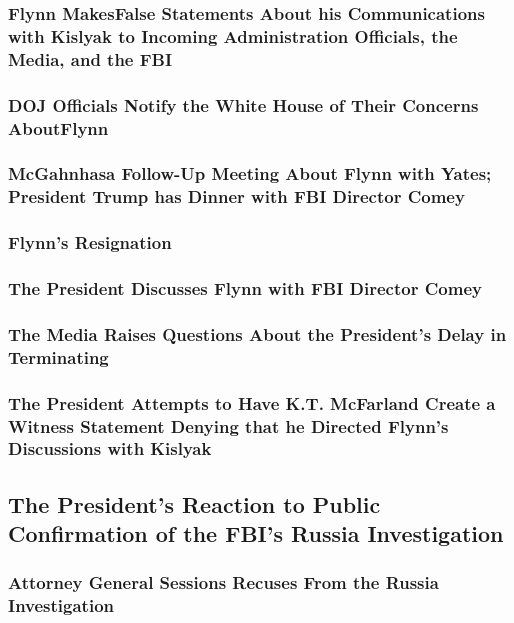 \subsubsection{Flynn MakesFalse Statements About his Communications with Kislyak to Incoming Administration Officials, the Media, and the FBI}

\subsubsection{DOJ Officials Notify the White House of Their Concerns AboutFlynn}

\subsubsection{McGahnhasa Follow-Up Meeting About Flynn with Yates; President Trump has Dinner with FBI Director Comey}

\subsubsection{Flynn’s Resignation}

\subsubsection{The President Discusses Flynn with FBI Director Comey}

\subsubsection{The Media Raises Questions About the President’s Delay in Terminating}

\subsubsection{The President Attempts to Have K.T. McFarland Create a Witness Statement Denying that he Directed Flynn’s Discussions with Kislyak}

\subsection{The President’s Reaction to Public Confirmation of the FBI’s Russia Investigation}

\subsubsection{Attorney General Sessions Recuses From the Russia Investigation}

